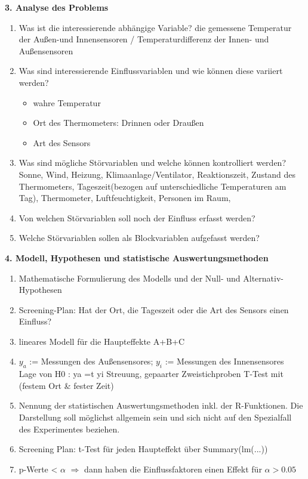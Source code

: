 \documentclass[ ngerman, fontsize= 12pt, paper=a4, headings=big, titlepage=true]{article}
\begin{document}
\textbf{3. Analyse des Problems}
\begin{enumerate}[-]
\item Was ist die interessierende abhängige Variable?
	die gemessene Temperatur der Außen-und Innensensoren / Temperaturdifferenz der Innen- und Außensensoren
\item Was sind interessierende Einflussvariablen und wie können diese variiert werden? \\
\begin{itemize}
	\item wahre Temperatur
	\item Ort des Thermometers: Drinnen oder Draußen
	\item Art des Sensors 
\end{itemize}



\item Was sind mögliche Störvariablen und welche können kontrolliert werden?\\
Sonne, Wind, Heizung, Klimaanlage/Ventilator, Reaktionszeit, Zustand des Thermometers,  Tageszeit(bezogen auf unterschiedliche Temperaturen am Tag), Thermometer, Luftfeuchtigkeit, Personen im Raum,
\item Von welchen Störvariablen soll noch der Einfluss erfasst werden? \\
\item Welche Störvariablen sollen als Blockvariablen aufgefasst werden? \\
\end{enumerate}

\textbf{4. Modell, Hypothesen und statistische Auswertungsmethoden}
\begin{enumerate}[-]
\item  Mathematische Formulierung des Modells und der Null- und Alternativ-Hypothesen \\
\item Screening-Plan: Hat der Ort, die Tageszeit oder die Art des Sensors einen Einfluss?
\item lineares Modell für die Haupteffekte A+B+C
\item  $y_a$ := Messungen des Außensensores; $y_i$ := Messungen des Innensensores \\
Lage von H0 : ya =t yi Streuung, gepaarter Zweistichproben T-Test mit (festem Ort \& fester Zeit)

\item Nennung der statistischen Auswertungsmethoden inkl. der R-Funktionen. Die Darstellung soll möglichst allgemein sein und sich nicht auf den Spezialfall des Experimentes beziehen. \\

\item Screening Plan: t-Test für jeden Haupteffekt über Summary(lm(...))
\item p-Werte < $\alpha$ $\Rightarrow$ dann haben die Einflussfaktoren einen Effekt für $\alpha > 0.05$ 
\end{enumerate}
\end{document}
